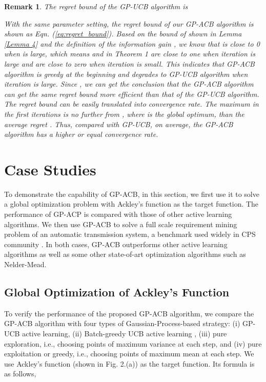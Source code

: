 \documentclass[10pt]{article}
\theoremstyle{plain}
\newtheorem{remark}{Remark}
\begin{document}
\begin{remark}
\label{remark for regret bounds}
The regret bound of the GP-UCB algorithm is \cite{Niranjan2009} 

With the same parameter setting, the regret bound of our GP-ACB algorithm is shown as Eqn. (\ref{eq:regret_bound}). Based on the bound of  shown in Lemma \ref{Lemma 4} and the definition of the information gain , we know that  is close to 0 when  is large, which means  and  in Theorem 1 are close to one when iteration  is large and are close to zero when iteration  is small. This indicates that GP-ACB algorithm is greedy at the beginning and degrades to GP-UCB algorithm when iteration  is large. Since , we can get the conclusion that the GP-ACB algorithm can get the same regret bound more efficient than that of the GP-UCB algorithm. The regret bound can be easily translated into convergence rate. The maximum  in the first  iterations is no further from , where  is the global optimum, than the average regret . Thus, compared with GP-UCB, on average, the GP-ACB algorithm has a higher or equal convergence rate. 
\end{remark}

\section{Case Studies}
\label{caseStudies}

To demonstrate the capability of GP-ACB, in this section, we first use it to solve a global optimization problem with Ackley's function as the target function. The performance of GP-ACP is compared with those of other active learning algorithms. We then use GP-ACB to solve a full scale requirement mining problem of an automatic transmission system, a benchmark used widely in CPS community \cite{jin2013mining,jin2014powertrain,sankaranarayanan2012falsification}. In both cases, GP-ACB outperforms other active learning algorithms as well as some other state-of-art optimization algorithms such as Nelder-Mead. 

\subsection{Global Optimization of Ackley's Function}

To verify the performance of the proposed GP-ACB algorithm, we compare the GP-ACB algorithm with four types of Gaussian-Process-based strategy: (i) GP-UCB active learning, (ii) Batch-greedy UCB active learning \cite{Desautels2014}, (iii) pure exploration, i.e., choosing points of maximum variance at each step, and (iv) pure exploitation or greedy, i.e., choosing points of maximum mean at each step. We use Ackley's function (shown in Fig. 2.(a)) as the target function. Its formula is as follows,
\end{document}
